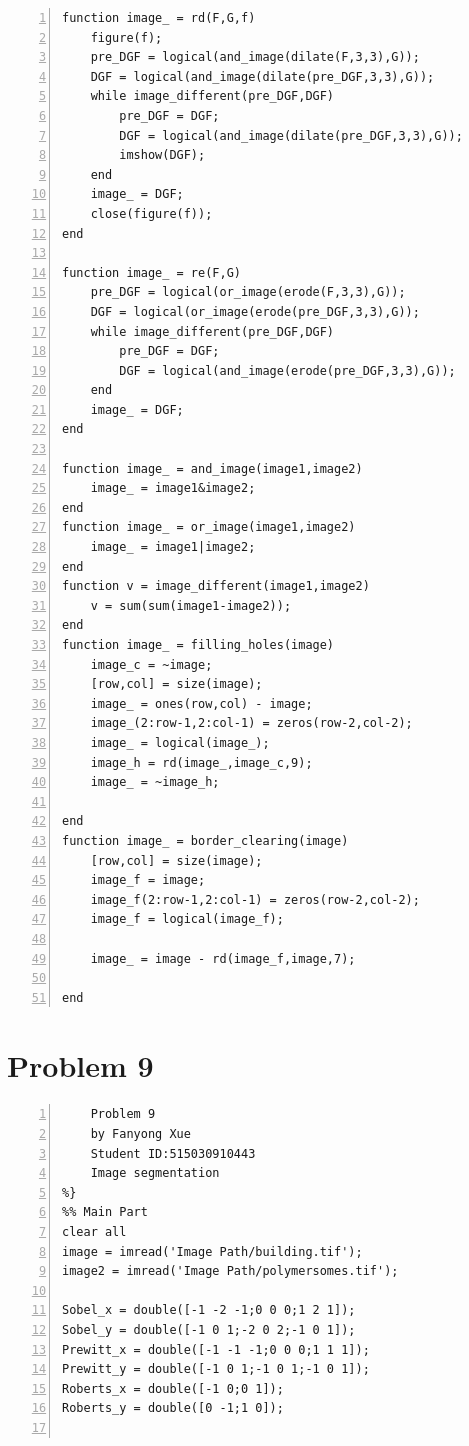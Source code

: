 \documentclass[11pt,oneside]{book}
\begin{document}
\begin{appendices}
\begin{lstlisting}[numbers=left, numberstyle=\tiny,keywordstyle=\color{blue!70},commentstyle=\color{red!50!green!50!blue!50},frame=shadowbox, rulesepcolor=\color{red!20!green!20!blue!20}]
function image_ = rd(F,G,f)
    figure(f);
    pre_DGF = logical(and_image(dilate(F,3,3),G));
    DGF = logical(and_image(dilate(pre_DGF,3,3),G));
    while image_different(pre_DGF,DGF)
        pre_DGF = DGF;
        DGF = logical(and_image(dilate(pre_DGF,3,3),G));
        imshow(DGF);
    end
    image_ = DGF;
    close(figure(f));
end

function image_ = re(F,G)
    pre_DGF = logical(or_image(erode(F,3,3),G));
    DGF = logical(or_image(erode(pre_DGF,3,3),G));
    while image_different(pre_DGF,DGF)
        pre_DGF = DGF;
        DGF = logical(and_image(erode(pre_DGF,3,3),G));
    end
    image_ = DGF;
end

function image_ = and_image(image1,image2)
    image_ = image1&image2;
end
function image_ = or_image(image1,image2)
    image_ = image1|image2;
end
function v = image_different(image1,image2)
    v = sum(sum(image1-image2));
end
function image_ = filling_holes(image)
    image_c = ~image;
    [row,col] = size(image);
    image_ = ones(row,col) - image;
    image_(2:row-1,2:col-1) = zeros(row-2,col-2);
    image_ = logical(image_);
    image_h = rd(image_,image_c,9);
    image_ = ~image_h;
    
end
function image_ = border_clearing(image)
    [row,col] = size(image);
    image_f = image;
    image_f(2:row-1,2:col-1) = zeros(row-2,col-2);
    image_f = logical(image_f);
    
    image_ = image - rd(image_f,image,7);
    
end
\end{lstlisting}

\section{Problem 9}

\begin{lstlisting}[numbers=left, numberstyle=\tiny,keywordstyle=\color{blue!70},commentstyle=\color{red!50!green!50!blue!50},frame=shadowbox, rulesepcolor=\color{red!20!green!20!blue!20}] 
%{
    Problem 9
    by Fanyong Xue
    Student ID:515030910443
    Image segmentation
%}
%% Main Part
clear all
image = imread('Image Path/building.tif');
image2 = imread('Image Path/polymersomes.tif');

Sobel_x = double([-1 -2 -1;0 0 0;1 2 1]);
Sobel_y = double([-1 0 1;-2 0 2;-1 0 1]);
Prewitt_x = double([-1 -1 -1;0 0 0;1 1 1]);
Prewitt_y = double([-1 0 1;-1 0 1;-1 0 1]);
Roberts_x = double([-1 0;0 1]);
Roberts_y = double([0 -1;1 0]);


\end{lstlisting}
\end{appendices}
\end{document}
